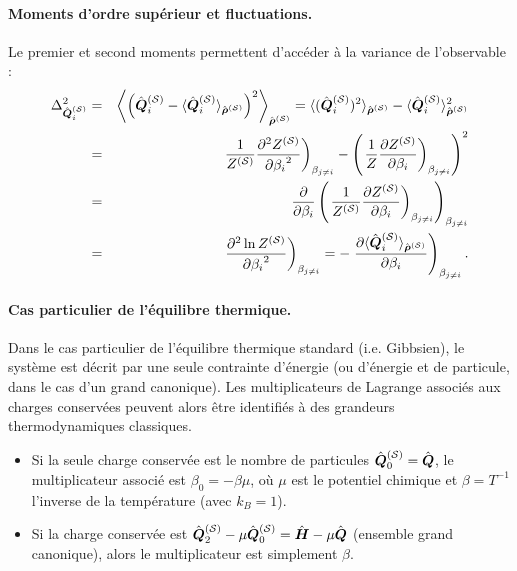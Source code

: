 \paragraph{Moments d’ordre supérieur et fluctuations.}
Le premier et second moments permettent d’accéder à la variance de l’observable :
\begin{eqnarray}
	\Delta_{\hat{\bm{Q}}_i^{(\mathcal{S})}}^2 &=&  	\left \langle \left (\hat{\bm{Q}}_i^{(\mathcal{S})} - \langle\hat{\bm{Q}}_i^{(\mathcal{S})} \rangle_{\hat{\bm{\rho}}^{(\mathcal{S})}} \right )^2  \right \rangle_{\hat{\bm{\rho}}^{(\mathcal{S})}}  = 	\langle(\hat{\bm{Q}}_i^{(\mathcal{S})})^2 \rangle_{\hat{\bm{\rho}}^{(\mathcal{S})}}  -  \langle\hat{\bm{Q}}_i^{(\mathcal{S})} \rangle_{\hat{\bm{\rho}}^{(\mathcal{S})}}^2 \nonumber  \\
		& = & \left . \frac{1}{Z^{(\mathcal{S})}} \frac{ \partial^2 Z^{(\mathcal{S})} }{ {\partial \beta_i}^2 }  \right )_{\beta_{j\neq i}} - \left ( \left . \frac{1}{Z}\frac{ \partial Z^{(\mathcal{S})} }{ \partial \beta_i }  \right )_{\beta_{j\neq i}}\right )^2     \nonumber\\
		&=&  \frac{\partial}{\partial \beta_i } \left ( \left . \frac{1}{Z^{(\mathcal{S})}} \frac{\partial Z^{(\mathcal{S})}}{\partial \beta_i }  \right )_{\beta_{j\neq i}}  \right )_{\beta_{j\neq i}} \nonumber \\
		&=&	  \left . \frac{\partial^2 \ln Z^{(\mathcal{S})}  }{{\partial \beta_i}^2 }  \right )_{\beta_{j\neq i}} =  - \left . 	\frac{\partial \langle\hat{\bm{Q}}_i^{(\mathcal{S})} \rangle_{\hat{\bm{\rho}}^{(\mathcal{S})}} }{\partial \beta_i } \right )_{\beta_{j\neq i}}.	
\end{eqnarray}

\paragraph{Cas particulier de l’équilibre thermique.}

Dans le cas particulier de l’équilibre thermique standard (i.e. Gibbsien), le système est décrit par une seule contrainte d’énergie (ou d’énergie et de particule, dans le cas d’un grand canonique). Les multiplicateurs de Lagrange associés aux charges conservées peuvent alors être identifiés à des grandeurs thermodynamiques classiques.

\begin{itemize}[label=$\bullet$]
	\item Si la seule charge conservée est le nombre de particules $\hat{\bm{Q}}_0^{(\mathcal{S})} = \hat{\bm{Q}}$, le multiplicateur associé est $\beta_0 = -\beta \mu$, où $\mu$ est le potentiel chimique et $\beta = T^{-1}$ l’inverse de la température (avec $k_B = 1$).
	
	\item Si la charge conservée est $\hat{\bm{Q}}_2^{(\mathcal{S})}-\mu\hat{\bm{Q}}_0^{(\mathcal{S})}  = \hat{\bm{H}} - \mu \hat{\bm{Q}} $ (ensemble grand canonique), alors le multiplicateur est simplement $ \beta$.
\end{itemize}

